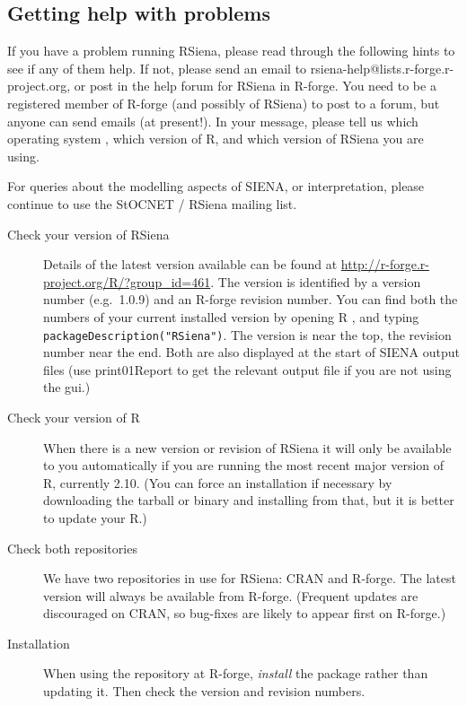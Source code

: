 \documentclass[a4paper,fleqn]{article}
\newcommand{\+}{\, + \,}
\newcommand{\sfn}[1]{\textsf{#1}}
\newcommand{\R}{{\sf R }}
\newcommand{\Rn}{{\sf R}}
\newcommand{\rs}{{\sf RSiena}}
\newcommand{\RS}{{\sf RSiena }}
\newcommand{\SI}{{\sf SIENA }}
\newcommand{\SN}{{\sf StOCNET }}
\newcommand{\si}{{\sf SIENA}}
\begin{document}
{\subsection{Getting help with problems}
\label{sec:problems}
If you have a problem running \rs, please read through the following hints to
see if any of them help. If not, please send an email to
rsiena-help@lists.r-forge.r-project.org, or post in the help forum for \RS in
R-forge. You need to be a registered member of R-forge (and possibly of \rs)
to post to a forum, but anyone can send emails (at present!). In your message,
please tell us which operating system , which version of \Rn, and which version
of \RS you are using.

For queries about the modelling aspects of \si, or interpretation, please
continue to use the \SN/ \RS mailing list.


\begin{description}
\item[Check your version of \RS] Details of the latest version available can
  be found at \url{http://r-forge.r-project.org/R/?group_id=461}. The version is
  identified by a version number (e.g.\ 1.0.9) and an R-forge revision
  number. You can find both the numbers of your current installed version by
  opening \R, and typing \verb|packageDescription("RSiena")|. The version is
  near the top, the revision number near the end. Both are also displayed at the
  start of \SI output files (use \sfn{print01Report} to get the relevant output
  file if you are not using the gui.)
\item[Check your version of \Rn] When there is a new version or revision of \RS
  it will only be available to you automatically if you are running the most
  recent major version of \Rn, currently 2.10. (You can force an installation if
  necessary by downloading the tarball or binary and installing from that, but
  it is better to update your \Rn.)
\item [Check both repositories] We have two repositories in use for \rs: CRAN
  and R-forge. The latest version will always be available from
  R-forge. (Frequent updates are discouraged on CRAN, so bug-fixes are likely to
  appear first on R-forge.)
\item[Installation] When using the repository at R-forge, \emph{install} the
  package rather than updating it. Then check the version and revision numbers.
\end{description}


\newpage
\begin{print}

\end{print}}
\end{document}
